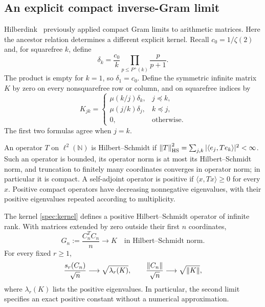 \subsection{An explicit compact inverse-Gram limit}

Hilberdink~\cite{hilberdink} previously applied compact Gram limits to arithmetic matrices. Here the ancestor relation determines a different explicit kernel. Recall $c_0=1/\zeta(2)$ and, for squarefree $k$, define
\begin{equation}\label{spec:density}
 \delta_k=\frac{c_0}{k}\prod_{p\le P^+(k)}\frac{p}{p+1}.
\end{equation}
The product is empty for $k=1$, so $\delta_1=c_0$. Define the symmetric infinite matrix $K$ by zero on every nonsquarefree row or column, and on squarefree indices by
\begin{equation}\label{spec:kernel}
 K_{jk}=\begin{cases}
 \mu(k/j)\delta_k,&j\preceq k,\\
 \mu(j/k)\delta_j,&k\preceq j,\\
 0,&\text{otherwise}.
 \end{cases}
\end{equation}
The first two formulas agree when $j=k$.

An operator $T$ on $\ell^2(\mathbb N)$ is Hilbert--Schmidt if
$\left\lVert T\right\rVert_{\mathrm{HS}}^2=\sum_{j,k}|\langle e_j,Te_k\rangle|^2<\infty$.
Such an operator is bounded, its operator norm is at most its Hilbert--Schmidt norm, and truncation to finitely many coordinates converges in operator norm; in particular it is compact. A self-adjoint operator is positive if $\langle x,Tx\rangle\ge0$ for every $x$. Positive compact operators have decreasing nonnegative eigenvalues, with their positive eigenvalues repeated according to multiplicity.

\begin{theorem}\label{spec:compact}
The kernel \eqref{spec:kernel} defines a positive Hilbert--Schmidt operator of infinite rank. With matrices extended by zero outside their first $n$ coordinates,
\begin{equation}\label{spec:Gramlimit}
 G_n:=\frac{C_n^TC_n}{n}\longrightarrow K
 \quad\text{in Hilbert--Schmidt norm}.
\end{equation}
For every fixed $r\ge1$,
\[
 \frac{s_r(C_n)}{\sqrt n}\longrightarrow\sqrt{\lambda_r(K)},
 \qquad
 \frac{\left\lVert C_n\right\rVert}{\sqrt n}\longrightarrow\sqrt{\left\lVert K\right\rVert},
\]
where $\lambda_r(K)$ lists the positive eigenvalues. In particular, the second limit specifies an exact positive constant without a numerical approximation.
\end{theorem}

